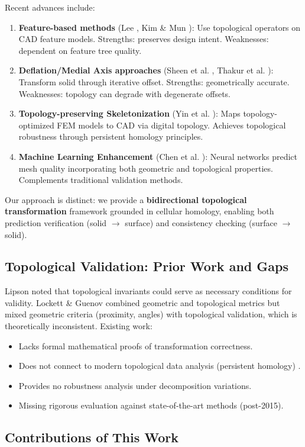 \documentclass[conference]{IEEEtran}
\begin{document}
Recent advances include:
\begin{enumerate}
\item \textbf{Feature-based methods} (Lee \cite{Lee2009}, Kim \& Mun \cite{Kim2014}): Use topological operators on CAD feature models. Strengths: preserves design intent. Weaknesses: dependent on feature tree quality.
\item \textbf{Deflation/Medial Axis approaches} (Sheen et al. \cite{Sheen2010}, Thakur et al. \cite{Thakur2009}): Transform solid through iterative offset. Strengths: geometrically accurate. Weaknesses: topology can degrade with degenerate offsets.
\item \textbf{Topology-preserving Skeletonization} (Yin et al. \cite{Yin2019}): Maps topology-optimized FEM models to CAD via digital topology. Achieves topological robustness through persistent homology principles.
\item \textbf{Machine Learning Enhancement} (Chen et al. \cite{Chen2022}): Neural networks predict mesh quality incorporating both geometric and topological properties. Complements traditional validation methods.
\end{enumerate}
Our approach is distinct: we provide a \textbf{bidirectional topological transformation} framework grounded in cellular homology, enabling both prediction verification (solid $\to$ surface) and consistency checking (surface $\to$ solid). \subsection{Topological Validation: Prior Work and Gaps}
Lipson \cite{Lipson1998} noted that topological invariants could serve as necessary conditions for validity. Lockett \& Guenov \cite{Lockett2008} combined geometric and topological metrics but mixed geometric criteria (proximity, angles) with topological validation, which is theoretically inconsistent. Existing work:
\begin{itemize}
\item Lacks formal mathematical proofs of transformation correctness.
\item Does not connect to modern topological data analysis (persistent homology) \cite{Chazal2021}.
\item Provides no robustness analysis under decomposition variations.
\item Missing rigorous evaluation against state-of-the-art methods (post-2015).
\end{itemize} \subsection{Contributions of This Work}
\end{document}

